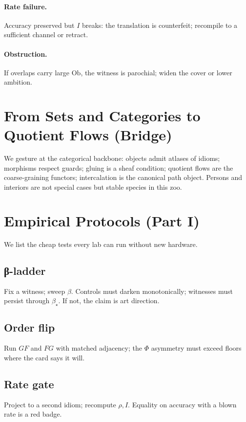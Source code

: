 \documentclass[11pt]{article}
\newcommand{\1}{\mathbf{1}}
\newcommand{\ratio}{\rho}
\newcommand{\rate}{I}
\newcommand{\Blur}{\beta}
\newcommand{\Fop}{F}
\newcommand{\Gop}{G}
\newcommand{\FG}{\Fop\Gop}
\newcommand{\GF}{\Gop\Fop}
\newcommand{\PhiField}{\Phi}
\newcommand{\Ob}{\mathrm{Ob}}
\begin{document}
\paragraph{Rate failure.} Accuracy preserved but \(\rate\) breaks: the translation is counterfeit; recompile to a sufficient channel or retract.

\paragraph{Obstruction.} If overlaps carry large \(\Ob\), the witness is parochial; widen the cover or lower ambition.

\section{From Sets and Categories to Quotient Flows (Bridge)}
We gesture at the categorical backbone: objects admit atlases of idioms; morphisms respect guards; gluing is a sheaf condition; quotient flows are the coarse-graining functors; intercalation is the canonical path object. Persons and interiors are not special cases but stable species in this zoo.

\section{Empirical Protocols (Part I)}
We list the cheap tests every lab can run without new hardware.

\subsection*{β-ladder}
Fix a witness; sweep \(\Blur\). Controls must darken monotonically; witnesses must persist through \(\Blur_\star\). If not, the claim is art direction.

\subsection*{Order flip}
Run \(\GF\) and \(\FG\) with matched adjacency; the \(\PhiField\) asymmetry must exceed floors where the card says it will. 

\subsection*{Rate gate}
Project to a second idiom; recompute \(\ratio,\rate\). Equality on accuracy with a blown rate is a red badge.
\end{document}
